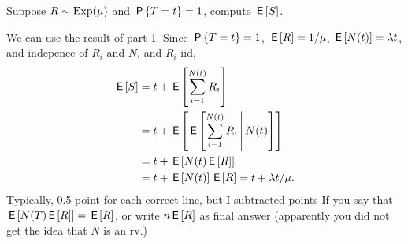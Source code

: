 \begin{exercise}[2]
  Suppose $R\sim\Exp{\mu}$  and $\P{T=t}=1$, compute $\E S$.
\begin{solution}
  We can use the result of part 1.
    Since $\P{T=t}=1$, $\E R = 1/\mu$,  $\E{N(t)} = \lambda t$, and indepence of $R_i$ and $N$, and $R_{i}$ iid,
    \begin{align*}
      \E S &= t + \E{\sum_{i=1}^{N(t)} R_{i}} \\
      &= t + \E{\E{\sum_{i=1}^{N(t)} R_{i}\given N(t)}} \\
      &= t + \E{N(t) \E R} \\
       &= t + \E{N(t)}\E R= t+ \lambda t/\mu.
    \end{align*}
Typically, 0.5 point for each correct line, but I subtracted points If you say that $\E{N(T) \E R} = \E R$, or write $n\E R$ as final answer (apparently you did not get the idea that $N$ is an rv.)

\end{solution}
\end{exercise}


